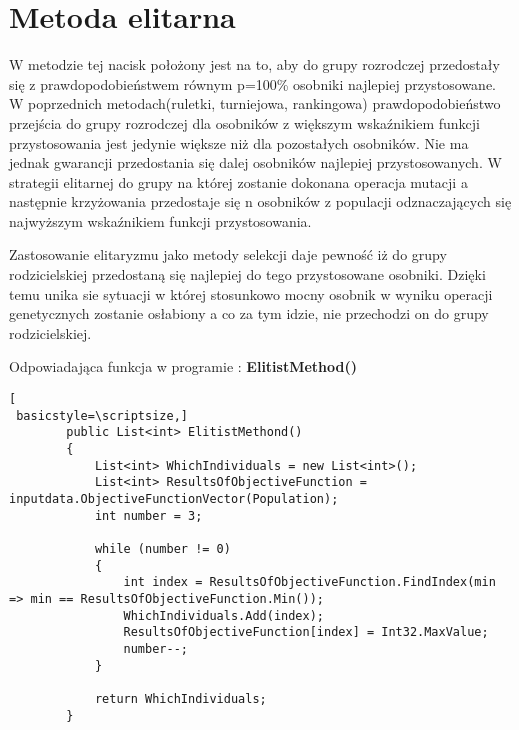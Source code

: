 
\section{Metoda elitarna}\label{sec:przygotowanieDokumentu}

W metodzie tej nacisk położony jest na to, aby do grupy rozrodczej przedostały się z prawdopodobieństwem równym p=100\% osobniki najlepiej przystosowane. W poprzednich metodach(ruletki, turniejowa, rankingowa) prawdopodobieństwo przejścia do grupy rozrodczej dla osobników z większym wskaźnikiem funkcji przystosowania jest jedynie większe niż dla pozostałych osobników. Nie ma jednak gwarancji przedostania się dalej osobników najlepiej przystosowanych. W strategii elitarnej do grupy na której zostanie dokonana operacja mutacji a następnie krzyżowania przedostaje się n osobników z populacji odznaczających się najwyższym wskaźnikiem funkcji przystosowania.\\
\par
Zastosowanie elitaryzmu jako metody selekcji daje pewność iż do grupy rodzicielskiej przedostaną się najlepiej do tego przystosowane osobniki. Dzięki temu unika sie sytuacji w której stosunkowo mocny osobnik w wyniku operacji genetycznych zostanie osłabiony a co za tym idzie, nie przechodzi on do grupy rodzicielskiej.\\
\par
Odpowiadająca funkcja w programie : \textbf{ElitistMethod()}

\begin{program}
\begin{lstlisting}[
 basicstyle=\scriptsize,]
        public List<int> ElitistMethond()
        {
            List<int> WhichIndividuals = new List<int>();
            List<int> ResultsOfObjectiveFunction = inputdata.ObjectiveFunctionVector(Population);
            int number = 3;

            while (number != 0)
            {
                int index = ResultsOfObjectiveFunction.FindIndex(min => min == ResultsOfObjectiveFunction.Min());
                WhichIndividuals.Add(index);
                ResultsOfObjectiveFunction[index] = Int32.MaxValue;
                number--;
            }

            return WhichIndividuals;
        }
\end{lstlisting}
\end{program}

